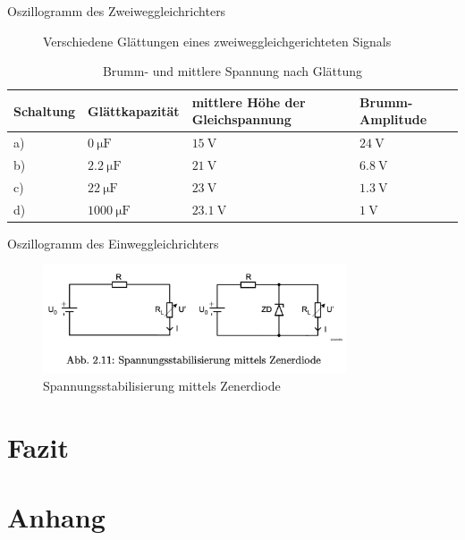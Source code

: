 \documentclass{article}
\theoremstyle{definition}
\begin{document}
\begin{aufgabe}{Oszillogramm des Zweiweggleichrichters}
\begin{figure}[H]
\begin{subfigure}[b]{0.49 \textwidth}
        \end{subfigure}
        \caption{Verschiedene Glättungen eines zweiweggleichgerichteten Signals}
    \end{figure}
    \begin{table}[H]
        \centering
        \begin{tabular}{|l|l|l|l|}
            \hline
            Schaltung & Glättkapazität & mittlere Höhe der Gleichspannung & Brumm-Amplitude  \\
            \hline
            a) & $\SI{0}{\micro\farad}$ & $\SI{15}{\volt}$ & $\SI{24}{\volt}$ \\
            b) & $\SI{2.2}{\micro\farad}$ & $\SI{21}{\volt}$ & $\SI{6.8}{\volt}$ \\
            c) & $\SI{22}{\micro\farad}$ & $\SI{23}{\volt}$ & $\SI{1.3}{\volt}$ \\
            d) & $\SI{1000}{\micro\farad}$ & $\SI{23.1}{\volt}$ & $\SI{1}{\volt}$ \\
            \hline
        \end{tabular}
        \caption{Brumm- und mittlere Spannung nach Glättung}
    \end{table}
    \auswertung
\end{aufgabe}

\begin{aufgabe}{Oszillogramm des Einweggleichrichters}
    \begin{figure}[H]
        \centering
        \includegraphics[width=0.8\textwidth]{figs/fig2_11.png}
        \caption{Spannungsstabilisierung mittels Zenerdiode~\cite{anleitung}}
        \label{aufbau_2_3}
    \end{figure}
\end{aufgabe}


\section{Fazit}

\section{Anhang}
\end{document}
